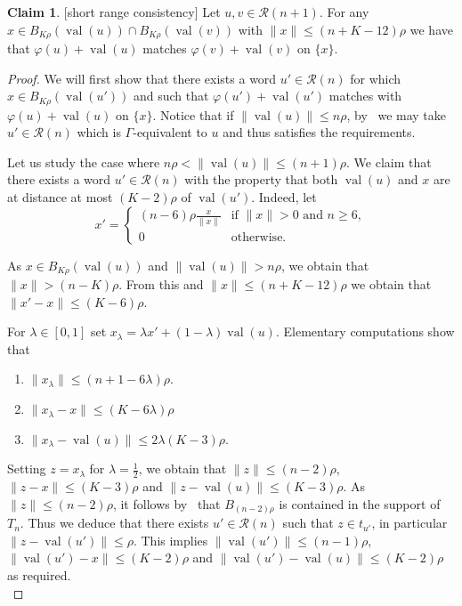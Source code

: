 \documentclass{article}
\theoremstyle{definition}
\newtheorem{claim}[theorem]{Claim} %
\theoremstyle{definition}
\newcommand{\norm}[1]{\|{#1}\|}
\newcommand{\val}{\operatorname{val}}
\begin{document}
    \begin{claim}\label{claim:short-range}[short range consistency]
        Let $u,v \in \mathcal{R}(n+1)$. For any $x\in B_{K\rho}(\val(u))\cap B_{K\rho}(\val(v))$ with $\norm{x}\leq (n+K-12)\rho$ we have that $\varphi(u)+\val(u)$ matches $\varphi(v)+\val(v)$ on $\{x\}$.
    \end{claim}

    \begin{proof}
        We will first show that there exists a word $u'\in \mathcal{R}(n)$ for which $x\in B_{K\rho}(\val(u'))$ and such that $\varphi(u')+\val(u')$ matches with $\varphi(u)+\val(u)$ on $\{x\}$. Notice that if $\|\val(u)\|\leq n\rho$, by~ we may take $u' \in \mathcal{R}(n)$ which is $\Gamma$-equivalent to $u$ and thus satisfies the requirements.
        
        Let us study the case where $n\rho <\norm{\val(u)} \leq (n+1)\rho$. We claim that there exists a word $u'\in \mathcal{R}(n)$ with the property that both $\val(u)$ and $x$ are at distance at most $(K-2)\rho$ of $\val(u')$. Indeed, let \[x' = \begin{cases}
            (n-6)\rho\frac{x}{\norm{x}} & \mbox{if } \norm{x} > 0 \mbox{ and } n \geq 6,\\
            0 & \mbox{otherwise.}
        \end{cases}\] 

    As $x \in B_{K\rho}(\val(u))$ and $\norm{\val(u)}> n\rho$, we obtain that $\norm{x} > (n-K)\rho$. From this and $\norm{x}\leq (n+K-12)\rho$ we obtain that $\norm{x'-x} \leq (K-6)\rho$.

    For $\lambda \in [0,1]$ set $x_{\lambda} = \lambda x'+(1-\lambda) \val(u)$. Elementary computations show that 
    \begin{enumerate}
        \item $\norm{x_{\lambda}} \leq (n+1-6\lambda)\rho$.
        \item $\norm{x_{\lambda} - x} \leq (K-6\lambda)\rho$ %
        \item $\norm{x_{\lambda} - \val(u)} \leq 2\lambda(K-3)\rho.$
    \end{enumerate}
    Setting $z = x_{\lambda}$ for $\lambda = \frac{1}{2}$, we obtain that $\norm{z}\leq (n-2)\rho$, $\norm{z-x}\leq (K-3)\rho$ and $\norm{z-\val(u)} \leq (K-3)\rho$. As $\norm{z}\leq (n-2)\rho$, it follows by~ that $B_{(n-2)\rho}$ is contained in the support of $T_n$. Thus we deduce that there exists $u' \in \mathcal{R}(n)$ such that $z \in t_{u'}$, in particular $\norm{z-\val(u')}\leq \rho$. This implies $\|\val(u')\|\leq (n-1)\rho$, $\norm{\val(u')-x}\leq (K-2)\rho$ and $\norm{\val(u')-\val(u)} \leq (K-2)\rho$ as required.\\


\end{proof}
\end{document}
